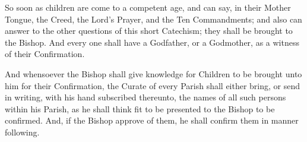 \begin{rubric}
So soon as children are come to a competent age, and can say, in their Mother Tongue, the Creed, the Lord's Prayer, and the Ten Commandments; and also can answer to the other questions of this short Catechism; they shall be brought to the Bishop. And every one shall have a Godfather, or a Godmother, as a witness of their Confirmation.
\end{rubric}

\begin{rubric}
And whensoever the Bishop shall give knowledge for Children to be brought unto him for their Confirmation, the Curate of every Parish shall either bring, or send in writing, with his hand subscribed thereunto, the names of all such persons within his Parish, as he shall think fit to be presented to the Bishop to be confirmed. And, if the Bishop approve of them, he shall confirm them in manner following.
\end{rubric}
